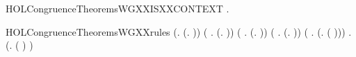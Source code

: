 \begin{SaveVerbatim}{HOLCongruenceTheoremsWGXXISXXCONTEXT}
\HOLTokenTurnstile{} \HOLSymConst{\HOLTokenForall{}}.   \HOLSymConst{\HOLTokenImp{}}  
\end{SaveVerbatim}
\newcommand{\HOLCongruenceTheoremsWGXXISXXCONTEXT}{\UseVerbatim{HOLCongruenceTheoremsWGXXISXXCONTEXT}}
\begin{SaveVerbatim}{HOLCongruenceTheoremsWGXXrules}
\HOLTokenTurnstile{} (\HOLSymConst{\HOLTokenForall{}}.  (\HOLTokenLambda{}. )) \HOLSymConst{\HOLTokenConj{}} (\HOLSymConst{\HOLTokenForall{}} .   \HOLSymConst{\HOLTokenImp{}}  (\HOLTokenLambda{}.  )) \HOLSymConst{\HOLTokenConj{}}
   (\HOLSymConst{\HOLTokenForall{}} .   \HOLSymConst{\HOLTokenConj{}}   \HOLSymConst{\HOLTokenImp{}}  (\HOLTokenLambda{}.   \HOLSymConst{\ensuremath{+}}  )) \HOLSymConst{\HOLTokenConj{}}
   (\HOLSymConst{\HOLTokenForall{}} .   \HOLSymConst{\HOLTokenConj{}}   \HOLSymConst{\HOLTokenImp{}}  (\HOLTokenLambda{}.   \HOLSymConst{\ensuremath{\parallel}}  )) \HOLSymConst{\HOLTokenConj{}}
   (\HOLSymConst{\HOLTokenForall{}} .   \HOLSymConst{\HOLTokenImp{}}  (\HOLTokenLambda{}. \HOLConst{\ensuremath{\nu}}  ( ))) \HOLSymConst{\HOLTokenConj{}}
   \HOLSymConst{\HOLTokenForall{}} .   \HOLSymConst{\HOLTokenImp{}}  (\HOLTokenLambda{}.  ( ) )
\end{SaveVerbatim}
\newcommand{\HOLCongruenceTheoremsWGXXrules}{\UseVerbatim{HOLCongruenceTheoremsWGXXrules}}
